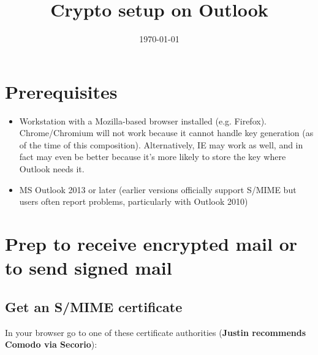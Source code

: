 \documentclass[pdftex,12pt,titlepage=false]{scrartcl}
\title{\rmfamily Crypto setup on Outlook}
\date{\rmfamily\today}
\begin{document}
\maketitle

\tableofcontents

\section{Prerequisites}
\begin{itemize}
\item Workstation with a Mozilla-based browser installed
  (e.g. Firefox).  Chrome/Chromium will not work because it cannot
  handle key generation (as of the time of this composition).
  Alternatively, IE may work as well, and in fact may even be better
  because it's more likely to store the key where Outlook needs it.
\item MS Outlook 2013 or later (earlier versions officially support
  S/MIME but users often report problems, particularly with Outlook
  2010)
\end{itemize}

\section{Prep to receive encrypted mail or to send signed mail}
\subsection{Get an S/MIME certificate}\label{catable}

In your browser go to one of these certificate authorities (\textbf{Justin recommends Comodo via Secorio}):\\
\end{document}
